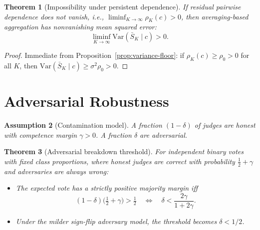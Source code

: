 \documentclass[11pt]{article}
\newtheorem{theorem}{Theorem}[section]
\newtheorem{assumption}[theorem]{Assumption}
\begin{document}
\begin{theorem}[Impossibility under persistent dependence]
\label{thm:impossibility-dependence}
If residual pairwise dependence does not vanish, i.e.,
$\liminf_{K \to \infty} \rho_K(c) > 0$, then averaging-based aggregation
has nonvanishing mean squared error:
\begin{equation}
\liminf_{K \to \infty} \mathrm{Var}(\bar S_K \mid c) > 0.
\end{equation}
\end{theorem}

\begin{proof}
Immediate from Proposition~\ref{prop:variance-floor}: if
$\rho_K(c) \ge \rho_0 > 0$ for all $K$, then
$\mathrm{Var}(\bar S_K \mid c) \ge \sigma^2 \rho_0 > 0$.
\end{proof}

\section{Adversarial Robustness}
\label{sec:adversarial}

\begin{assumption}[Contamination model]
\label{asm:contamination}
A fraction $(1-\delta)$ of judges are honest with competence margin
$\gamma > 0$. A fraction $\delta$ are adversarial.
\end{assumption}

\begin{theorem}[Adversarial breakdown threshold]
\label{thm:adversarial}
For independent binary votes with fixed class proportions, where honest judges are correct with probability
$\frac{1}{2} + \gamma$ and adversaries are always wrong:
\begin{itemize}
\item The expected vote has a strictly positive majority margin iff
\begin{equation}
(1-\delta)\Big(\tfrac{1}{2} + \gamma\Big) > \tfrac{1}{2}
\quad\Longleftrightarrow\quad
\delta < \frac{2\gamma}{1 + 2\gamma}.
\end{equation}
\item Under the milder sign-flip adversary model, the threshold becomes
$\delta < 1/2$.
\end{itemize}
\end{theorem}
\end{document}
